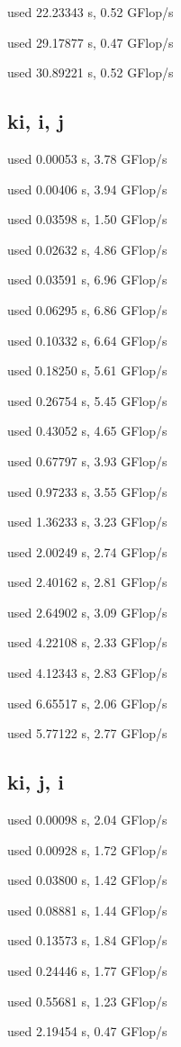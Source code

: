 \documentclass[12pt]{article}
\begin{document}
used 22.23343 s, 0.52 GFlop/s

used 29.17877 s, 0.47 GFlop/s

used 30.89221 s, 0.52 GFlop/s

\subsection{ki, i, j}

used 0.00053 s, 3.78 GFlop/s

used 0.00406 s, 3.94 GFlop/s

used 0.03598 s, 1.50 GFlop/s

used 0.02632 s, 4.86 GFlop/s

used 0.03591 s, 6.96 GFlop/s

used 0.06295 s, 6.86 GFlop/s

used 0.10332 s, 6.64 GFlop/s

used 0.18250 s, 5.61 GFlop/s

used 0.26754 s, 5.45 GFlop/s

used 0.43052 s, 4.65 GFlop/s

used 0.67797 s, 3.93 GFlop/s

used 0.97233 s, 3.55 GFlop/s

used 1.36233 s, 3.23 GFlop/s

used 2.00249 s, 2.74 GFlop/s

used 2.40162 s, 2.81 GFlop/s

used 2.64902 s, 3.09 GFlop/s

used 4.22108 s, 2.33 GFlop/s

used 4.12343 s, 2.83 GFlop/s

used 6.65517 s, 2.06 GFlop/s

used 5.77122 s, 2.77 GFlop/s

\subsection{ki, j, i}

used 0.00098 s, 2.04 GFlop/s

used 0.00928 s, 1.72 GFlop/s

used 0.03800 s, 1.42 GFlop/s

used 0.08881 s, 1.44 GFlop/s

used 0.13573 s, 1.84 GFlop/s

used 0.24446 s, 1.77 GFlop/s

used 0.55681 s, 1.23 GFlop/s

used 2.19454 s, 0.47 GFlop/s
\end{document}
